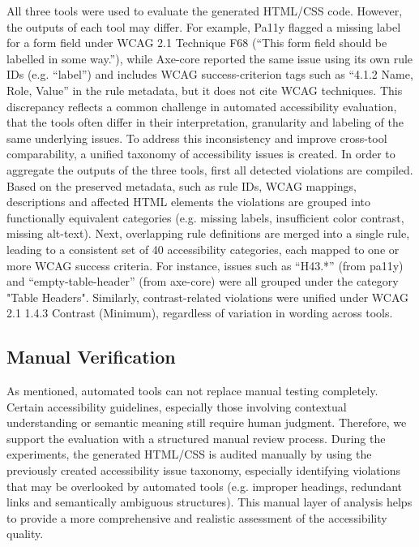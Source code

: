 All three tools were used to evaluate the generated HTML/CSS code. 
However, the outputs of each tool may differ. For example, 
Pa11y flagged a missing label for a form field under WCAG
2.1 Technique F68 (“This form field should be labelled in some way.”), 
while Axe-core
reported the same issue using its own rule IDs (e.g. “label”) and includes 
WCAG success-criterion
tags such as “4.1.2 Name, Role, Value” in the rule metadata, but it does not cite WCAG
techniques. This discrepancy reflects a common challenge in automated accessibility evaluation,
that the tools often differ in their interpretation, granularity and labeling of the same underlying
issues.\newline
To address this inconsistency and improve cross-tool comparability, a 
unified taxonomy of accessibility issues is created. In order to 
aggregate the outputs of the three tools, first all 
detected violations are compiled. Based on the preserved 
metadata, such as rule IDs, WCAG mappings, descriptions and affected
HTML elements the violations are grouped into functionally 
equivalent categories (e.g. missing labels, insufficient color contrast,
missing alt-text). Next, overlapping rule definitions are merged 
into a single rule, leading to a consistent set of 40 
accessibility categories, each mapped to one or more WCAG 
success criteria. For instance, issues such as “H43.*” 
(from pa11y) and “empty-table-header” (from axe-core) were all
grouped under the category "Table Headers". Similarly, 
contrast-related violations were unified
under WCAG 2.1 1.4.3 Contrast (Minimum), 
regardless of variation in wording across tools.

\subsection{Manual Verification}
As mentioned, automated tools can not replace manual testing completely. 
Certain accessibility guidelines, especially those involving 
contextual understanding or semantic meaning still require 
human judgment. Therefore, we support the evaluation with a 
structured manual review process. During the experiments, the 
generated HTML/CSS is audited manually by using the previously 
created accessibility issue taxonomy, especially identifying 
violations that may be overlooked by automated tools 
(e.g. improper headings, redundant links and semantically 
ambiguous structures). This manual layer of analysis helps 
to provide a more comprehensive and realistic assessment of
the accessibility quality.

